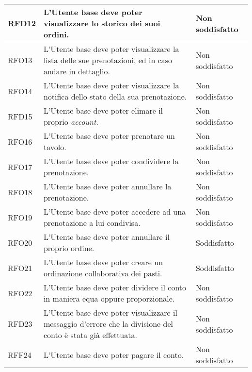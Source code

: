 \begin{longtable}{|l|p{}|p{3cm}|}
	\hline
	RFD12       & L'Utente base deve poter visualizzare lo storico dei suoi ordini.                                                       & Non soddisfatto \\
	\hline
	RFO13       & L'Utente base deve poter visualizzare la lista delle sue prenotazioni, ed in caso andare in dettaglio.                  & Non soddisfatto \\
	\hline
	RFO14       & L'Utente base deve poter visualizzare la notifica dello stato della sua prenotazione.                                   & Non soddisfatto \\
	\hline
	RFD15       & L'Utente base deve poter elimare il proprio \textit{account}.                                                           & Non soddisfatto \\
	\hline
	RFO16       & L'Utente base deve poter prenotare un tavolo.                                                                           & Non soddisfatto \\
	\hline
	RFO17       & L'Utente base deve poter condividere la prenotazione.                                                                   & Non soddisfatto \\
	\hline
	RFO18       & L'Utente base deve poter annullare la prenotazione.                                                                     & Non soddisfatto \\
	\hline
	RFO19       & L'Utente base deve poter accedere ad una prenotazione a lui condivisa.                            					  & Non soddisfatto \\
	\hline
	RFO20       & L'Utente base deve poter annullare il proprio ordine.                                                                   & Soddisfatto \\
	\hline
	RFO21       & L'Utente base deve poter creare un ordinazione collaborativa dei pasti.                                                 & Soddisfatto \\
	\hline
	RFO22       & L'Utente base deve poter dividere il conto in maniera equa oppure proporzionale.                               		& Non soddisfatto                                                  \\
	\hline
	RFD23       & L'Utente base deve poter visualizzare il messaggio d'errore che la divisione del conto è stata già effettuata. 		& Non soddisfatto                                       \\
	\hline
	RFF24       & L'Utente base deve poter pagare il conto.                                                                      		& Non soddisfatto                                                                             \\

\end{longtable}
